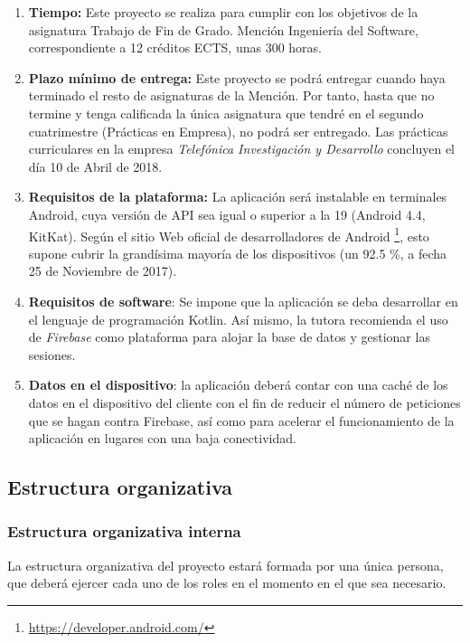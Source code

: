 \documentclass[twoside]{report}
\begin{document}
\begin{enumerate}
\item \textbf{Tiempo:} Este proyecto se realiza para cumplir con los objetivos de la asignatura Trabajo de Fin de Grado. Mención Ingeniería del Software, correspondiente a 12 créditos ECTS, unas 300 horas.

\item \textbf{Plazo mínimo de entrega:} Este proyecto se podrá entregar cuando haya terminado el resto de asignaturas de la Mención. Por tanto, hasta que no termine y tenga calificada la única asignatura que tendré en el segundo cuatrimestre (Prácticas en Empresa), no podrá ser entregado. Las prácticas curriculares en la empresa \textit{Telefónica Investigación y Desarrollo} concluyen el día 10 de Abril de 2018.

\item \textbf{Requisitos de la plataforma:} La aplicación será instalable en terminales Android, cuya versión de API sea igual o superior a la 19 (Android 4.4, KitKat). Según el sitio Web oficial de desarrolladores de Android \footnote{\url{https://developer.android.com/}}, esto supone cubrir la grandísima mayoría de los dispositivos (un 92.5 \%, a fecha 25 de Noviembre de 2017)\cite{androidversiondist}.

\item \textbf{Requisitos de software}: Se impone que la aplicación se deba desarrollar en el lenguaje de programación Kotlin. Así mismo, la tutora recomienda el uso de \textit{Firebase} como plataforma para alojar la base de datos y gestionar las sesiones.

\item \textbf{Datos en el dispositivo}: la aplicación deberá contar con una caché de los datos en el dispositivo del cliente con el fin de reducir el número de peticiones que se hagan contra Firebase, así como para acelerar el funcionamiento de la aplicación en lugares con una baja conectividad.
\end{enumerate}

\subsection{Estructura organizativa}
\subsubsection{Estructura organizativa interna}
La estructura organizativa del proyecto estará formada por una única persona, que deberá ejercer cada uno de los roles en el momento en el que sea necesario. \cite{upedu} \vspace{0.5cm}
\end{document}
